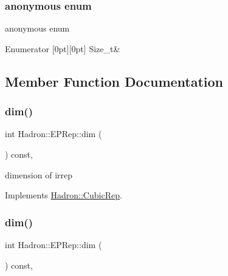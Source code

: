 \subsubsection{\texorpdfstring{anonymous enum}{anonymous enum}}
{\footnotesize\ttfamily anonymous enum}

\begin{DoxyEnumFields}{Enumerator}
[0pt][0pt]{}\mbox{\label{structHadron_1_1EPRep_a80b6a6715807bd9e591db0488df0e456acb7f3437b2518d8dcf731196499ff41c}} 
Size\+\_\+t&\\
\hline

\end{DoxyEnumFields}


\subsection{Member Function Documentation}
\mbox{\label{structHadron_1_1EPRep_a79d6baee5b8e9548d0b5729f854368c5}} 
\subsubsection{\texorpdfstring{dim()}{dim()}\hspace{0.1cm}{\footnotesize\ttfamily [1/2]}}
{\footnotesize\ttfamily int Hadron\+::\+E\+P\+Rep\+::dim (\begin{DoxyParamCaption}{ }\end{DoxyParamCaption}) const\hspace{0.3cm}{\ttfamily [inline]}, {\ttfamily [virtual]}}

dimension of irrep 

Implements \mbox{\hyperlink{structHadron_1_1CubicRep_ac178d14064f037a66af4b9fb4b312d51}{Hadron\+::\+Cubic\+Rep}}.

\mbox{\label{structHadron_1_1EPRep_a79d6baee5b8e9548d0b5729f854368c5}} 
\subsubsection{\texorpdfstring{dim()}{dim()}\hspace{0.1cm}{\footnotesize\ttfamily [2/2]}}
{\footnotesize\ttfamily int Hadron\+::\+E\+P\+Rep\+::dim (\begin{DoxyParamCaption}{ }\end{DoxyParamCaption}) const\hspace{0.3cm}{\ttfamily [inline]}, {\ttfamily [virtual]}}

